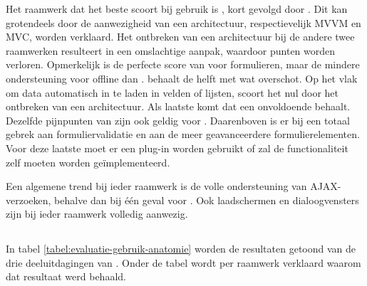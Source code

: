Het raamwerk dat het beste scoort bij gebruik is \kendo{}, kort gevolgd door \st{}.
Dit kan grotendeels door de aanwezigheid van een architectuur, respectievelijk MVVM en MVC, worden verklaard.
Het ontbreken van een architectuur bij de andere twee raamwerken resulteert in een omslachtige aanpak, waardoor punten worden verloren.
Opmerkelijk is de perfecte score van \kendo{} voor formulieren, maar de mindere ondersteuning voor offline dan \st{}.
\jqm{} behaalt de helft met wat overschot.
Op het vlak om data automatisch in te laden in velden of lijsten, scoort het nul door het ontbreken van een architectuur. 
Als laatste komt \lungo{} dat een onvoldoende behaalt.
Dezelfde pijnpunten van \jqm{} zijn ook geldig voor \lungo{}.
Daarenboven is er bij \lungo{} een totaal gebrek aan formuliervalidatie en aan de meer geavanceerdere formulierelementen.
Voor deze laatste moet er een plug-in worden gebruikt of zal de functionaliteit zelf moeten worden geïmplementeerd. 

Een algemene trend bij ieder raamwerk is de volle ondersteuning van AJAX-verzoeken, behalve dan bij één geval voor \lungo{}.
Ook laadschermen en dialoogvensters zijn bij ieder raamwerk volledig aanwezig.



\subsection{}
\label{sec:evaluatie-gebruik-anatomie}

In tabel \ref{tabel:evaluatie-gebruik-anatomie} worden de resultaten getoond van de drie deeluitdagingen van .
Onder de tabel wordt per raamwerk verklaard waarom dat resultaat werd behaald.

\begin{table}
\centering
{}
\caption{Gebruik van .}
\label{tabel:evaluatie-gebruik-anatomie}
\end{table}

